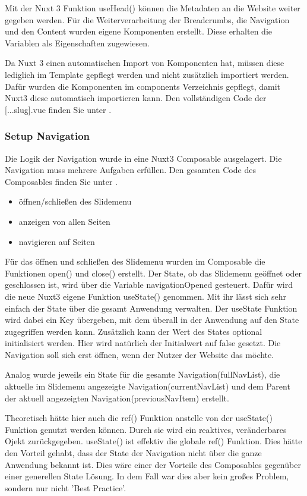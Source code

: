 Mit der Nuxt 3 Funktion useHead() können die Metadaten an die Website weiter gegeben werden. Für die Weiterverarbeitung der Breadcrumbs, die Navigation und den Content wurden eigene Komponenten erstellt. Diese erhalten die Variablen als Eigenschaften zugewiesen. 

Da Nuxt 3 einen automatischen Import von Komponenten hat, müssen diese lediglich im Template gepflegt werden und nicht zusätzlich importiert werden. Dafür wurden die Komponenten im components Verzeichnis gepflegt, damit Nuxt3 diese automatisch importieren kann. Den vollständigen Code der [...slug].vue finden Sie unter .

\subsubsection{Setup Navigation}
\label{sec:Setup Navigation}

Die Logik der Navigation wurde in eine Nuxt3 Composable ausgelagert. Die Navigation muss mehrere Aufgaben erfüllen. Den gesamten Code des Composables finden Sie unter .

\begin{itemize}
\item öffnen/schließen des Slidemenu
\item anzeigen von allen Seiten
\item navigieren auf Seiten
\end{itemize}

Für das öffnen und schließen des Slidemenu wurden im Composable die Funktionen open() und close() erstellt. Der State, ob das Slidemenu geöffnet oder geschlossen ist, wird über die Variable navigationOpened gesteuert. Dafür wird die neue Nuxt3 eigene Funktion useState() genommen. Mit ihr lässt sich sehr einfach der State über die gesamt Anwendung verwalten. Der useState Funktion wird dabei ein Key übergeben, mit dem überall in der Anwendung auf den State zugegriffen werden kann. Zusätzlich kann der Wert des States optional initialisiert werden. Hier wird natürlich der Initialwert auf false gesetzt. Die Navigation soll sich erst öffnen, wenn der Nutzer der Website das möchte.

Analog wurde jeweils ein State für die gesamte Navigation(fullNavList), die aktuelle im Slidemenu angezeigte Navigation(currentNavList) und dem Parent der aktuell angezeigten Navigation(previousNavItem) erstellt.

Theoretisch hätte hier auch die ref() Funktion anstelle von der useState() Funktion genutzt werden können. Durch sie wird ein reaktives, veränderbares Ojekt zurückgegeben. useState() ist effektiv die globale ref() Funktion. Dies hätte den Vorteil gehabt, dass der State der Navigation nicht über die ganze Anwendung bekannt ist. Dies wäre einer der Vorteile des Composables gegenüber einer generellen State Lösung. In dem Fall war dies aber kein großes Problem, sondern nur nicht 'Best Practice'.

